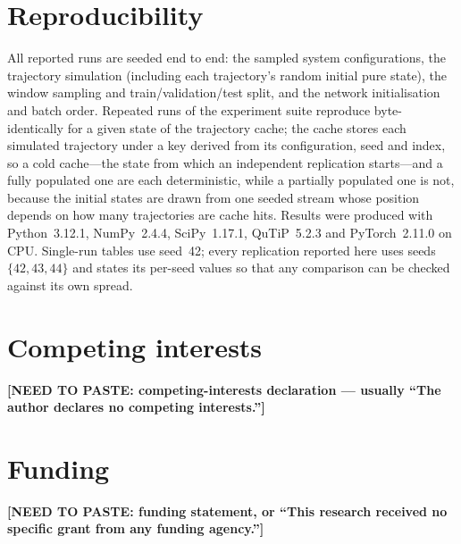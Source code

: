\documentclass[twocolumn,10pt]{article}
\newcommand{\needspaste}[1]{{\color{red}\textbf{[NEED TO PASTE: #1]}}}
\begin{document}
\section*{Reproducibility}
All reported runs are seeded end to end: the sampled system
configurations, the trajectory simulation (including each trajectory's
random initial pure state), the window sampling and train/validation/test
split, and the network initialisation and batch order.
Repeated runs of the experiment suite reproduce byte-identically for a
given state of the trajectory cache; the cache stores each simulated
trajectory under a key derived from its configuration, seed and index, so
a cold cache---the state from which an independent replication
starts---and a fully populated one are each deterministic, while a
partially populated one is not, because the initial states are drawn from
one seeded stream whose position depends on how many trajectories are
cache hits.
Results were produced with Python~3.12.1, NumPy~2.4.4, SciPy~1.17.1,
QuTiP~5.2.3 and PyTorch~2.11.0 on CPU.
Single-run tables use seed~42; every replication reported here uses seeds
$\{42,43,44\}$ and states its per-seed values so that any comparison can
be checked against its own spread.

\section*{Competing interests}
\needspaste{competing-interests declaration --- usually ``The author
declares no competing interests.''}

\section*{Funding}
\needspaste{funding statement, or ``This research received no specific
grant from any funding agency.''}
\end{document}
